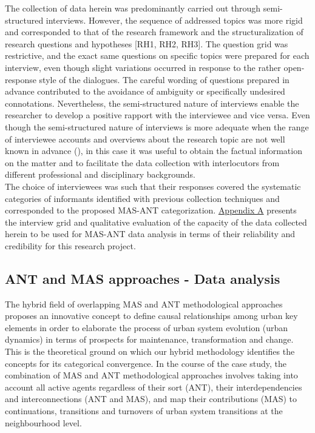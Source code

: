 \documentclass[11pt]{report}
\begin{document}
{{{{The collection of data herein was predominantly carried out through semi-structured interviews. However, the sequence of addressed topics was more rigid and corresponded to that of the research framework and the structuralization of research questions and hypotheses [RH1, RH2, RH3].
The question grid was restrictive, and the exact same questions on specific topics were prepared for each interview, even though slight variations occurred in response to the rather open-response style of the dialogues. The careful wording of questions prepared in advance contributed to the avoidance of ambiguity or specifically undesired connotations. Nevertheless, the semi-structured nature of interviews enable the researcher to develop a positive rapport with the interviewee and vice versa. Even though the semi-structured nature of interviews is more adequate when the range of interviewee accounts and overviews about the research topic are not well known in advance (\href{King}{\citealt{cassell_qualitative_1994}}), in this case it was useful to obtain the factual information on the matter and to facilitate the data collection with  interlocutors from different professional and disciplinary backgrounds. 
\\

The choice of interviewees was such that their responses covered the systematic categories of informants identified with previous collection techniques and corresponded to the proposed  MAS-ANT categorization. \href{Appendix A}{Appendix A} presents the interview grid and qualitative evaluation of the capacity of the data collected herein to be used for MAS-ANT data analysis in terms of their reliability and credibility for this research project.

\subsection{ANT and MAS approaches - Data analysis}

The hybrid field of overlapping MAS and ANT methodological approaches proposes an innovative concept to define causal relationships among urban key elements in order to elaborate the process of urban system evolution (urban dynamics) in terms of prospects for maintenance, transformation and change. This is the theoretical ground on which our hybrid methodology identifies the concepts for its categorical convergence. In the course of the case study, the combination of MAS and ANT methodological approaches involves taking into account all active agents regardless of their sort (ANT), their interdependencies and interconnections (ANT and MAS), and map their contributions (MAS) to continuations, transitions and turnovers of urban system transitions at the neighbourhood level.    

}}}}
\end{document}
